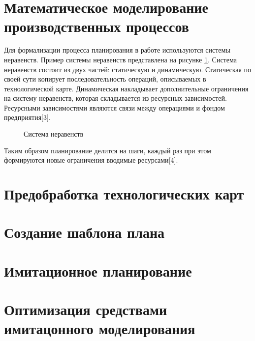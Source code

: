 \section{Математическое моделирование производственных процессов}

Для формализации процесса планирования в работе используются системы неравенств. Пример системы неравенств представлена на рисунке \ref{ris:sys1}. Система неравенств состоит из двух частей: статическую и динамическую. Статическая по своей сути копирует последовательность операций, описываемых в технологической карте. Динамическая накладывает дополнительные ограничения на систему неравенств, которая складывается из ресурсных зависимостей. Ресурсными зависимостями являются связи между операциями и фондом предприятия[3].

\begin{figure}[H]
    \caption{Система неравенств}
    \label{ris:sys1}
\end{figure}

Таким образом планирование делится на шаги, каждый раз при этом формируются новые ограничения вводимые ресурсами[4].

\section{Предобработка технологических карт}

\section{Создание шаблона плана}

\section{Имитационное планирование}

\section{Оптимизация средствами имитацонного моделирования}

